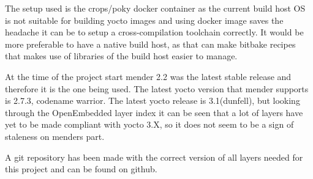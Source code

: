 \documentclass[../../main.tex]{subfiles}
\begin{document}
The setup used is the crops/poky docker container as the current build host OS is
not suitable for building yocto images and using docker image saves the headache it can be to
setup a cross-compilation toolchain correctly.
It would be more preferable to have a native build host, as that can make bitbake recipes
that makes use of libraries of the build host easier to manage.

At the time of the project start mender 2.2 was the latest stable release and therefore it
is the one being used.
The latest yocto version that mender supports is 2.7.3, codename warrior.
The latest yocto release is 3.1(dunfell), but looking through the
OpenEmbedded layer index\cite{oe-index}
it can be seen that a lot of layers have yet to be made compliant with yocto 3.X, so it does not
seem to be a sign of staleness on menders part.

A git repository has been made with the correct version of all layers needed for this project and
can be found on github\cite{yocto-build}.
\end{document}

